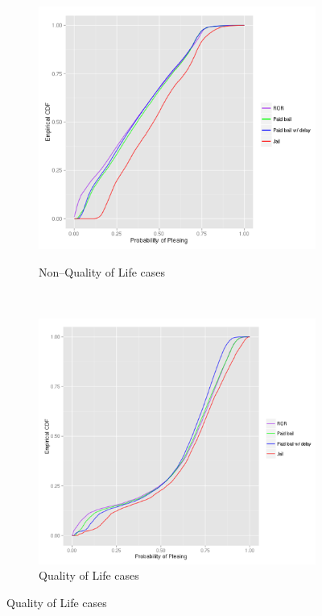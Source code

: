 \begin{figure}[t!]
  \centering
  \begin{subfigure}[b]{0.49\textwidth}
    \caption{Non--Quality of Life cases}
    \includegraphics[width=\textwidth]{figures/figx.png}
    \label{fig:non--QoL_plead}
  \end{subfigure}
  ~
  \begin{subfigure}[b]{0.49\textwidth}
    \caption{Quality of Life cases}
    \includegraphics[width=\textwidth]{figures/figy.png}

\end{subfigure}
\end{figure}
